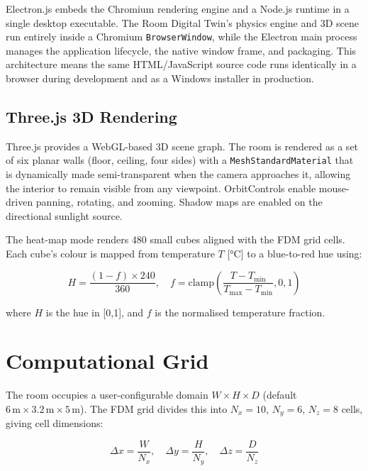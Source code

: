 \documentclass[12pt,a4paper]{report}
\begin{document}
Electron.js \cite{electron} embeds the Chromium rendering engine and a Node.js runtime in a single desktop executable. The Room Digital Twin's physics engine and 3D scene run entirely inside a Chromium \texttt{BrowserWindow}, while the Electron main process manages the application lifecycle, the native window frame, and packaging. This architecture means the same HTML/JavaScript source code runs identically in a browser during development and as a Windows installer in production.

\subsection{Three.js 3D Rendering}
\label{subsec:threejs}

Three.js \cite{threejs} provides a WebGL-based 3D scene graph. The room is rendered as a set of six planar walls (floor, ceiling, four sides) with a \texttt{MeshStandardMaterial} that is dynamically made semi-transparent when the camera approaches it, allowing the interior to remain visible from any viewpoint. OrbitControls enable mouse-driven panning, rotating, and zooming. Shadow maps are enabled on the directional sunlight source.

The heat-map mode renders 480 small cubes aligned with the FDM grid cells. Each cube's colour is mapped from temperature $T$ [°C] to a blue-to-red hue using:

\begin{equation}
  H = \frac{(1 - f) \times 240}{360}, \quad f = \text{clamp}\!\left(\frac{T - T_\text{min}}{T_\text{max} - T_\text{min}}, 0, 1\right)
  \label{eq:heatmap}
\end{equation}

where $H$ is the hue in [0,1], and $f$ is the normalised temperature fraction.

\section{Computational Grid}
\label{sec:grid}

The room occupies a user-configurable domain $W \times H \times D$ (default $6\,\text{m} \times 3.2\,\text{m} \times 5\,\text{m}$). The FDM grid divides this into $N_x = 10$, $N_y = 6$, $N_z = 8$ cells, giving cell dimensions:

\begin{equation}
  \Delta x = \frac{W}{N_x}, \quad \Delta y = \frac{H}{N_y}, \quad \Delta z = \frac{D}{N_z}
  \label{eq:celldims}
\end{equation}
\end{document}
